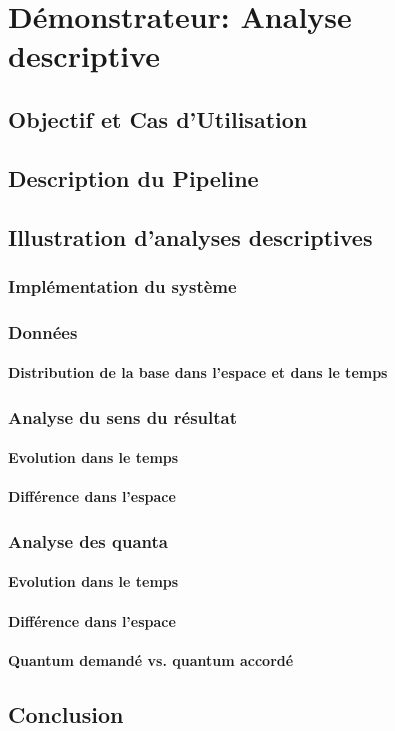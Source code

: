 \chapter{Démonstrateur: Analyse descriptive}
\label{chap:demo}

\section{Objectif et Cas d'Utilisation}
\label{sec:demo:objectif}

\section{Description du Pipeline}
\label{sec:demo:motivation}

\section{Illustration d'analyses descriptives}
\label{sec:demo:experimentations}

\subsection{Implémentation du système}

\subsection{Données}
\subsubsection{Distribution de la base dans l'espace et dans le temps}

\subsection{Analyse du sens du résultat}
\subsubsection{Evolution dans le temps}
\subsubsection{Différence dans l'espace}

\subsection{Analyse des quanta}
\subsubsection{Evolution dans le temps}
\subsubsection{Différence dans l'espace}
\subsubsection{Quantum demandé vs. quantum accordé}

\section{Conclusion}
\label{sec:demo:conclusion}